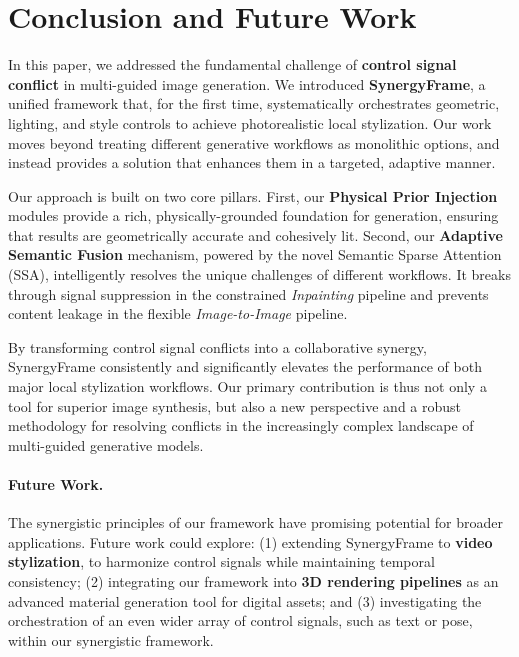 \documentclass[letterpaper]{article} %
\begin{document}
\section{Conclusion and Future Work}
\label{sec:conclusion}

In this paper, we addressed the fundamental challenge of \textbf{control signal conflict} in multi-guided image generation. We introduced \textbf{SynergyFrame}, a unified framework that, for the first time, systematically orchestrates geometric, lighting, and style controls to achieve photorealistic local stylization. Our work moves beyond treating different generative workflows as monolithic options, and instead provides a solution that enhances them in a targeted, adaptive manner.

Our approach is built on two core pillars. First, our \textbf{Physical Prior Injection} modules provide a rich, physically-grounded foundation for generation, ensuring that results are geometrically accurate and cohesively lit. Second, our \textbf{Adaptive Semantic Fusion} mechanism, powered by the novel Semantic Sparse Attention (SSA), intelligently resolves the unique challenges of different workflows. It breaks through signal suppression in the constrained \textit{Inpainting} pipeline and prevents content leakage in the flexible \textit{Image-to-Image} pipeline.

By transforming control signal conflicts into a collaborative synergy, SynergyFrame consistently and significantly elevates the performance of both major local stylization workflows. Our primary contribution is thus not only a tool for superior image synthesis, but also a new perspective and a robust methodology for resolving conflicts in the increasingly complex landscape of multi-guided generative models.

\paragraph{Future Work.} The synergistic principles of our framework have promising potential for broader applications. Future work could explore: (1) extending SynergyFrame to \textbf{video stylization}, to harmonize control signals while maintaining temporal consistency; (2) integrating our framework into \textbf{3D rendering pipelines} as an advanced material generation tool for digital assets; and (3) investigating the orchestration of an even wider array of control signals, such as text or pose, within our synergistic framework.


\end{document}
